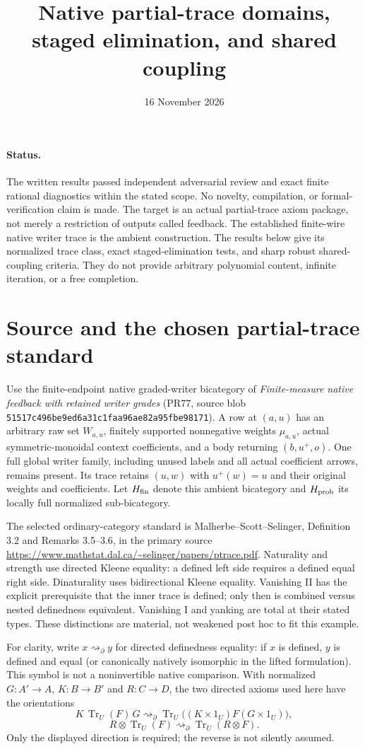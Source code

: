 \documentclass[11pt]{article}
\title{Native partial-trace domains, staged elimination, and shared coupling}
\date{16 November 2026}
\newcommand{\HM}{H_{\rm fin}}\newcommand{\HP}{H_{\rm prob}}
\begin{document}
\maketitle
\paragraph{Status.} The written results passed independent adversarial review and exact finite rational diagnostics within the stated scope. No novelty, compilation, or formal-verification claim is made. The target is an actual partial-trace axiom package, not merely a restriction of outputs called feedback. The established finite-wire native writer trace is the ambient construction. The results below give its normalized trace class, exact staged-elimination tests, and sharp robust shared-coupling criteria. They do not provide arbitrary polynomial content, infinite iteration, or a free completion.

\section{Source and the chosen partial-trace standard}
Use the finite-endpoint native graded-writer bicategory of \emph{Finite-measure native feedback with retained writer grades} (PR77, source blob \texttt{51517c496be9ed6a31c1faa96ae82a95fbe98171}). A row at $(a,u)$ has an arbitrary raw set $W_{a,u}$, finitely supported nonnegative weights $\mu_{a,u}$, actual symmetric-monoidal context coefficients, and a body returning $(b,u^+,o)$. One full global writer family, including unused labels and all actual coefficient arrows, remains present. Its trace retains $(u,w)$ with $u^+(w)=u$ and their original weights and coefficients. Let $\HM$ denote this ambient bicategory and $\HP$ its locally full normalized sub-bicategory.

The selected ordinary-category standard is Malherbe--Scott--Selinger, Definition 3.2 and Remarks 3.5--3.6, in the primary source \url{https://www.mathstat.dal.ca/~selinger/papers/ptrace.pdf}. Naturality and strength use directed Kleene equality: a defined left side requires a defined equal right side. Dinaturality uses bidirectional Kleene equality. Vanishing II has the explicit prerequisite that the inner trace is defined; only then is combined versus nested definedness equivalent. Vanishing I and yanking are total at their stated types. These distinctions are material, not weakened post hoc to fit this example.

For clarity, write $x\rightsquigarrow_\partial y$ for directed definedness equality: if $x$ is defined, $y$ is defined and equal (or canonically natively isomorphic in the lifted formulation). This symbol is not a noninvertible native comparison. With normalized $G:A'\to A$, $K:B\to B'$ and $R:C\to D$, the two directed axioms used here have the orientations
\[
 K\,\operatorname{Tr}_U(F)\,G
 \rightsquigarrow_\partial
 \operatorname{Tr}_U\big((K\times1_U)F(G\times1_U)\big),
\]
\[
 R\otimes\operatorname{Tr}_U(F)
 \rightsquigarrow_\partial
 \operatorname{Tr}_U(R\otimes F).
\]
Only the displayed direction is required; the reverse is not silently assumed.
\end{document}
